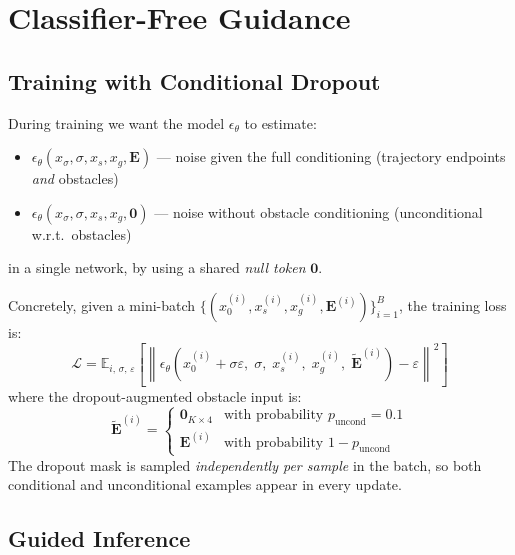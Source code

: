\documentclass{article}
\begin{document}
\section{Classifier-Free Guidance}
\label{sec:cfg}

\subsection{Training with Conditional Dropout}

During training we want the model $\epsilon_\theta$ to estimate:
\begin{itemize}
    \item $\epsilon_\theta(x_\sigma, \sigma, x_s, x_g, \mathbf{E})$ — noise
          given the full conditioning (trajectory endpoints \emph{and} obstacles)
    \item $\epsilon_\theta(x_\sigma, \sigma, x_s, x_g, \mathbf{0})$ — noise
          without obstacle conditioning (unconditional w.r.t.\ obstacles)
\end{itemize}
in a single network, by using a shared \emph{null token} $\mathbf{0}$.

Concretely, given a mini-batch $\{(x_0^{(i)}, x_s^{(i)}, x_g^{(i)}, \mathbf{E}^{(i)})\}_{i=1}^B$,
the training loss is:
\begin{equation}
    \mathcal{L} = \mathbb{E}_{i,\, \sigma,\, \varepsilon}\!\left[
        \left\|\epsilon_\theta\!\left(x_0^{(i)} + \sigma\varepsilon,\; \sigma,\;
                                      x_s^{(i)},\; x_g^{(i)},\; \tilde{\mathbf{E}}^{(i)}\right)
               - \varepsilon\right\|^2
    \right]
\end{equation}
where the dropout-augmented obstacle input is:
\begin{equation}
    \tilde{\mathbf{E}}^{(i)} =
    \begin{cases}
        \mathbf{0}_{K \times 4} & \text{with probability } p_{\mathrm{uncond}} = 0.1 \\
        \mathbf{E}^{(i)}        & \text{with probability } 1 - p_{\mathrm{uncond}}
    \end{cases}
\end{equation}
The dropout mask is sampled \emph{independently per sample} in the batch,
so both conditional and unconditional examples appear in every update.

\subsection{Guided Inference}
\end{document}
